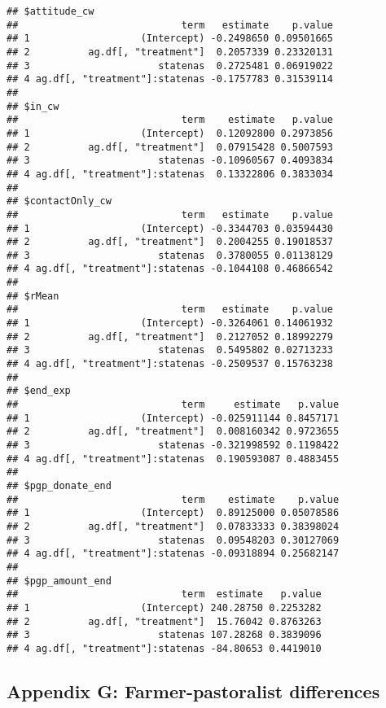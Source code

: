 \documentclass[
]{article}
\begin{document}
\begin{verbatim}
## $attitude_cw
##                            term   estimate    p.value
## 1                   (Intercept) -0.2498650 0.09501665
## 2          ag.df[, "treatment"]  0.2057339 0.23320131
## 3                      statenas  0.2725481 0.06919022
## 4 ag.df[, "treatment"]:statenas -0.1757783 0.31539114
## 
## $in_cw
##                            term    estimate   p.value
## 1                   (Intercept)  0.12092800 0.2973856
## 2          ag.df[, "treatment"]  0.07915428 0.5007593
## 3                      statenas -0.10960567 0.4093834
## 4 ag.df[, "treatment"]:statenas  0.13322806 0.3833034
## 
## $contactOnly_cw
##                            term   estimate    p.value
## 1                   (Intercept) -0.3344703 0.03594430
## 2          ag.df[, "treatment"]  0.2004255 0.19018537
## 3                      statenas  0.3780055 0.01138129
## 4 ag.df[, "treatment"]:statenas -0.1044108 0.46866542
## 
## $rMean
##                            term   estimate    p.value
## 1                   (Intercept) -0.3264061 0.14061932
## 2          ag.df[, "treatment"]  0.2127052 0.18992279
## 3                      statenas  0.5495802 0.02713233
## 4 ag.df[, "treatment"]:statenas -0.2509537 0.15763238
## 
## $end_exp
##                            term     estimate   p.value
## 1                   (Intercept) -0.025911144 0.8457171
## 2          ag.df[, "treatment"]  0.008160342 0.9723655
## 3                      statenas -0.321998592 0.1198422
## 4 ag.df[, "treatment"]:statenas  0.190593087 0.4883455
## 
## $pgp_donate_end
##                            term    estimate    p.value
## 1                   (Intercept)  0.89125000 0.05078586
## 2          ag.df[, "treatment"]  0.07833333 0.38398024
## 3                      statenas  0.09548203 0.30127069
## 4 ag.df[, "treatment"]:statenas -0.09318894 0.25682147
## 
## $pgp_amount_end
##                            term  estimate   p.value
## 1                   (Intercept) 240.28750 0.2253282
## 2          ag.df[, "treatment"]  15.76042 0.8763263
## 3                      statenas 107.28268 0.3839096
## 4 ag.df[, "treatment"]:statenas -84.80653 0.4419010
\end{verbatim}

\hypertarget{appendix-g-farmer-pastoralist-differences}{%
\subsection{Appendix G: Farmer-pastoralist
differences}\label{appendix-g-farmer-pastoralist-differences}}
\end{document}
